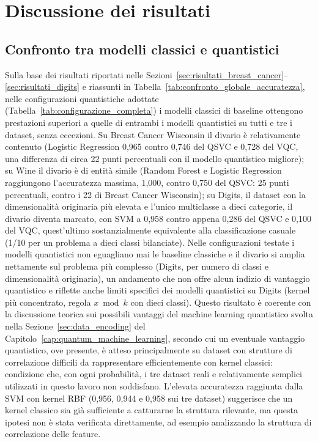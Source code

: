 \section{Discussione dei risultati}
\label{sec:discussione_risultati}

\subsection{Confronto tra modelli classici e quantistici}
Sulla base dei risultati riportati nelle Sezioni~\ref{sec:risultati_breast_cancer}--\ref{sec:risultati_digits} e riassunti in Tabella~\ref{tab:confronto_globale_accuratezza}, nelle configurazioni quantistiche adottate (Tabella~\ref{tab:configurazione_completa}) i modelli classici di baseline ottengono prestazioni superiori a quelle di entrambi i modelli quantistici su tutti e tre i dataset, senza eccezioni. Su Breast Cancer Wisconsin il divario è relativamente contenuto (Logistic Regression 0,965 contro 0,746 del QSVC e 0,728 del VQC, una differenza di circa 22 punti percentuali con il modello quantistico migliore); su Wine il divario è di entità simile (Random Forest e Logistic Regression raggiungono l'accuratezza massima, 1,000, contro 0,750 del QSVC: 25 punti percentuali, contro i 22 di Breast Cancer Wisconsin); su Digits, il dataset con la dimensionalità originaria più elevata e l'unico multiclasse a dieci categorie, il divario diventa marcato, con SVM a 0,958 contro appena 0,286 del QSVC e 0,100 del VQC, quest'ultimo sostanzialmente equivalente alla classificazione casuale (1/10 per un problema a dieci classi bilanciate). Nelle configurazioni testate i modelli quantistici non eguagliano mai le baseline classiche e il divario si amplia nettamente sul problema più complesso (Digits, per numero di classi e dimensionalità originaria), un andamento che non offre alcun indizio di vantaggio quantistico e riflette anche limiti specifici dei modelli quantistici su Digits (kernel più concentrato, regola $x \bmod k$ con dieci classi). Questo risultato è coerente con la discussione teorica sui possibili vantaggi del machine learning quantistico svolta nella Sezione~\ref{sec:data_encoding} del Capitolo~\ref{cap:quantum_machine_learning}, secondo cui un eventuale vantaggio quantistico, ove presente, è atteso principalmente su dataset con strutture di correlazione difficili da rappresentare efficientemente con kernel classici: condizione che, con ogni probabilità, i tre dataset reali e relativamente semplici utilizzati in questo lavoro non soddisfano. L'elevata accuratezza raggiunta dalla SVM con kernel RBF (0,956, 0,944 e 0,958 sui tre dataset) suggerisce che un kernel classico sia già sufficiente a catturarne la struttura rilevante, ma questa ipotesi non è stata verificata direttamente, ad esempio analizzando la struttura di correlazione delle feature.

